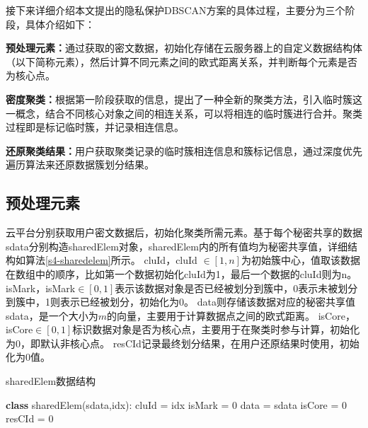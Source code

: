 接下来详细介绍本文提出的隐私保护DBSCAN方案的具体过程，主要分为三个阶段，具体介绍如下：
\begin{compactitem}
	\item \textbf{预处理元素：}通过获取的密文数据，初始化存储在云服务器上的自定义数据结构体（以下简称元素），然后计算不同元素之间的欧式距离关系，并判断每个元素是否为核心点。
	\item \textbf{密度聚类：}根据第一阶段获取的信息，提出了一种全新的聚类方法，引入临时簇这一概念，结合不同核心对象之间的相连关系，可以将相连的临时簇进行合并。聚类过程即是标记临时簇，并记录相连信息。
	\item \textbf{还原聚类结果：}用户获取聚类记录的临时簇相连信息和簇标记信息，通过深度优先遍历算法来还原数据簇划分结果。
\end{compactitem}

\subsection{预处理元素}
云平台分别获取用户密文数据后，初始化聚类所需元素。基于每个秘密共享的数据sdata分别构造sharedElem对象，sharedElem内的所有值均为秘密共享值，详细结构如算法\ref{s4-sharedelem}所示。
cluId，cluId $ \in [1, n]$为初始簇中心，值取该数据在数组中的顺序，比如第一个数据初始化cluId为1，最后一个数据的cluId则为n。
isMark，isMark$ \in [0,1] $表示该数据对象是否已经被划分到簇中，0表示未被划分到簇中，1则表示已经被划分，初始化为0。
data则存储该数据对应的秘密共享值sdata，是一个大小为$ m $的向量，主要用于计算数据点之间的欧式距离。
isCore，isCore$ \in[0,1]$标识数据对象是否为核心点，主要用于在聚类时参与计算，初始化为0，即默认非核心点。
resCId记录最终划分结果，在用户还原结果时使用，初始化为0值。


\begin{algorithm}
	\caption{sharedElem数据结构}
	\label{s4-sharedelem}
	\begin{algorithmic}[1]
		\STATE \textbf{class} sharedElem(sdata,idx):
		\STATE \hspace{\algorithmicindent} cluId = idx
		\STATE \hspace{\algorithmicindent} isMark = 0
		\STATE \hspace{\algorithmicindent} data = sdata
		\STATE \hspace{\algorithmicindent} isCore = 0
		\STATE \hspace{\algorithmicindent} resCId = 0
	\end{algorithmic}
\end{algorithm}

